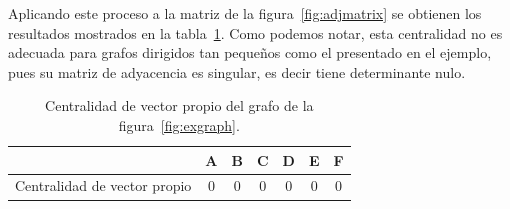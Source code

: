 Aplicando este proceso a la matriz de la figura~\ref{fig:adjmatrix} se obtienen
los resultados mostrados en la tabla~\ref{tab:exeigen}. Como podemos notar, esta
centralidad no es adecuada para grafos dirigidos tan pequeños como el presentado
en el ejemplo, pues su matriz de adyacencia es singular, es decir tiene
determinante nulo.
\begin{table}[htpb]
  \centering
  \begin{tabular}{|l|c|c|c|c|c|c|}
    \hline         &  A  &  B  &  C  &  D  &  E  &  F  \\\hline
    Centralidad de vector propio & $0$ & $0$ & $0$ & $0$ & $0$ & $0$ \\\hline
  \end{tabular}
  \caption{Centralidad de vector propio del grafo de la
    figura~\ref{fig:exgraph}.}
  \label{tab:exeigen}
\end{table}
